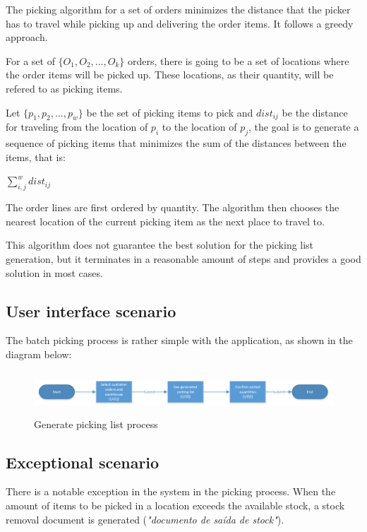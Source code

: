 \documentclass[a4paper]{article}
\begin{document}
The picking algorithm for a set of orders minimizes the distance that the picker has to travel while picking up and delivering the order items. It follows a greedy approach.

For a set of $\{O_1, O_2, ..., O_k\}$ orders, there is going to be a set of locations where the order items will be picked up. These locations, as their quantity, will be refered to as picking items.

Let $\{p_1, p_2, ..., p_w\}$ be the set of picking items to pick and $dist_{ij}$ be the distance for traveling from the location of $p_i$ to the location of $p_j$, the goal is to generate a sequence of picking items that minimizes the sum of the distances between the items, that is: 

\centerline{$\sum_{i,j}^{w} dist_{ij}$}

The order lines are first ordered by quantity. The algorithm then chooses the nearest location of the current picking item as the next place to travel to. 

This algorithm does not guarantee the best solution for the picking list generation, but it terminates in a reasonable amount of steps and provides a good solution in most cases.

\subsection{User interface scenario}
The batch picking process is rather simple with the application, as shown in the diagram below:

\begin{figure}[h!]
\centerline{\includegraphics[height=1.6cm, width=16cm]{pickingDiagram.png}}
\caption{Generate picking list process}
\end{figure}

\subsection{Exceptional scenario}
There is a notable exception in the system in the picking process. When the amount of items to be picked in a location exceeds the available stock, a stock removal document is generated (\textit{"documento de saída de stock"}).

\newpage
\end{document}
